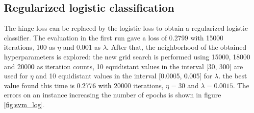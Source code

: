\documentclass{article}
\begin{document}
\subsection{Regularized logistic classification}
The hinge loss can be replaced by the logistic loss to obtain a regularized logistic classifier. The evaluation in the first run gave a loss of 0.2799 with 15000 iterations, 100 as $\eta$ and 0.001 as $\lambda$. After that, the neighborhood of the obtained hyperparameters is explored: the new grid search is performed using 15000, 18000 and 20000 as iteration counts, 10 equidistant values in the interval [30, 300] are used for $\eta$ and 10 equidistant values in the interval [0.0005, 0.005] for $\lambda$. the best value found this time is 0.2776 with 20000 iterations, $\eta=30$ and $\lambda=0.0015 $. The errors on an instance increasing the number of epochs is shown in figure \ref{fig:svm_log}.
\end{document}
